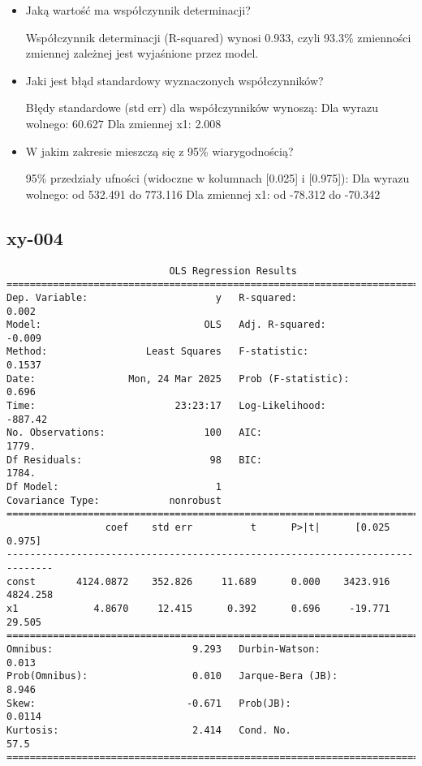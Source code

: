 \documentclass{article}
\begin{document}
\begin{itemize}
    \item  Jaką wartość ma współczynnik determinacji?
    
Współczynnik determinacji (R-squared) wynosi 0.933, czyli 93.3\% zmienności zmiennej zależnej jest wyjaśnione przez model.

    \item Jaki jest błąd standardowy wyznaczonych współczynników?
    
Błędy standardowe (std err) dla współczynników wynoszą:
    Dla wyrazu wolnego: 60.627
    Dla zmiennej x1: 2.008

    \item W jakim zakresie mieszczą się z 95\% wiarygodnością?
    
95\% przedziały ufności (widoczne w kolumnach [0.025] i [0.975]):
    Dla wyrazu wolnego: od 532.491 do 773.116
    Dla zmiennej x1: od -78.312 do -70.342

\end{itemize}


\subsection{xy-004}
\begin{verbatim}
                            OLS Regression Results                            
==============================================================================
Dep. Variable:                      y   R-squared:                       0.002
Model:                            OLS   Adj. R-squared:                 -0.009
Method:                 Least Squares   F-statistic:                    0.1537
Date:                Mon, 24 Mar 2025   Prob (F-statistic):              0.696
Time:                        23:23:17   Log-Likelihood:                -887.42
No. Observations:                 100   AIC:                             1779.
Df Residuals:                      98   BIC:                             1784.
Df Model:                           1                                         
Covariance Type:            nonrobust                                         
==============================================================================
                 coef    std err          t      P>|t|      [0.025      0.975]
------------------------------------------------------------------------------
const       4124.0872    352.826     11.689      0.000    3423.916    4824.258
x1             4.8670     12.415      0.392      0.696     -19.771      29.505
==============================================================================
Omnibus:                        9.293   Durbin-Watson:                   0.013
Prob(Omnibus):                  0.010   Jarque-Bera (JB):                8.946
Skew:                          -0.671   Prob(JB):                       0.0114
Kurtosis:                       2.414   Cond. No.                         57.5
==============================================================================
\end{verbatim}
\end{document}
